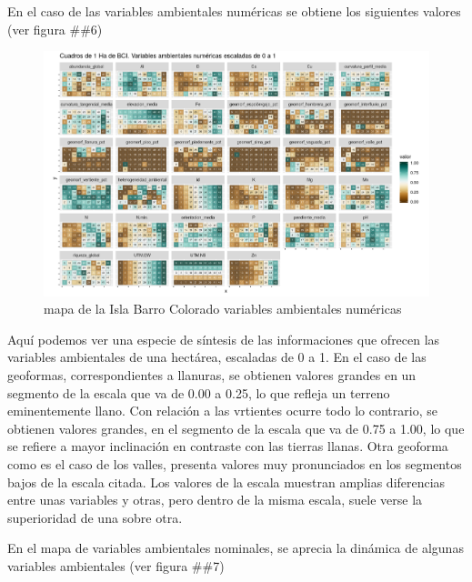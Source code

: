 \documentclass[11pt,]{article}
\begin{document}
En el caso de las variables ambientales numéricas se obtiene los
siguientes valores (ver figura \#\#6)

\begin{figure}
\centering
\includegraphics[width=1.00000\textwidth]{mapas_variables_ambientales_numericas.png}
\caption{mapa de la Isla Barro Colorado variables ambientales numéricas
\label{fig:bci_map}}
\end{figure}

Aquí podemos ver una especie de síntesis de las informaciones que
ofrecen las variables ambientales de una hectárea, escaladas de 0 a 1.
En el caso de las geoformas, correspondientes a llanuras, se obtienen
valores grandes en un segmento de la escala que va de 0.00 a 0.25, lo
que refleja un terreno eminentemente llano. Con relación a las vrtientes
ocurre todo lo contrario, se obtienen valores grandes, en el segmento de
la escala que va de 0.75 a 1.00, lo que se refiere a mayor inclinación
en contraste con las tierras llanas. Otra geoforma como es el caso de
los valles, presenta valores muy pronunciados en los segmentos bajos de
la escala citada. Los valores de la escala muestran amplias diferencias
entre unas variables y otras, pero dentro de la misma escala, suele
verse la superioridad de una sobre otra.

En el mapa de variables ambientales nominales, se aprecia la dinámica de
algunas variables ambientales (ver figura \#\#7)
\end{document}
